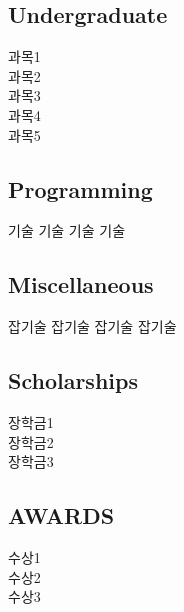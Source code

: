 \documentclass[a4paper]{MagicalCV}
\begin{document}
\begin{minipage}[t]{0.33\textwidth}
\subsection{Undergraduate}
과목1 \\
과목2 \\
과목3 \\
과목4 \\
과목5
\sectionsep


\subsection{Programming}
기술 
\textbullet{} 
기술
\textbullet{} 
기술 
\textbullet{} 
기술

\sectionsep
\subsection{Miscellaneous}
잡기술 
\textbullet{} 
잡기술
\textbullet{} 
잡기술 
\textbullet{} 
잡기술


\subsection{Scholarships}
장학금1\\
장학금2\\
장학금3\\
\sectionsep


\subsection{AWARDS}
수상1\\
수상2\\
수상3\\
\sectionsep





\end{minipage} 
\hfill
\end{document}
